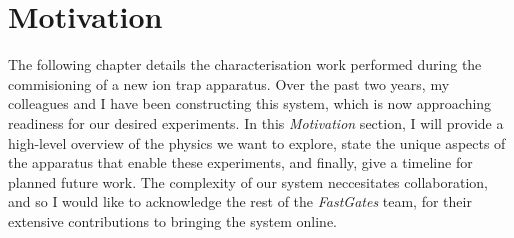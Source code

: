 \section{Motivation}

    The following chapter details the characterisation work performed during the
    commisioning of a new ion trap apparatus. Over the past two years, my
    colleagues and I have been constructing this system, which is now
    approaching readiness for our desired experiments. In this
    \textit{Motivation} section, I will provide a high-level overview of the
    physics we want to explore, state the unique aspects of the apparatus that
    enable these experiments, and finally, give a timeline for planned future
    work. The complexity of our system neccesitates collaboration, and so I
    would like to acknowledge the rest of the \emph{FastGates} team, for their
    extensive contributions to bringing the system online. \\

